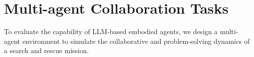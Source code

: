 \documentclass[11pt]{article}
\begin{document}



\section{Multi-agent Collaboration Tasks}
To evaluate the capability of LLM-based embodied agents, we design a multi-agent environment to simulate the collaborative and problem-solving dynamics of a search and rescue mission.


\end{document}
